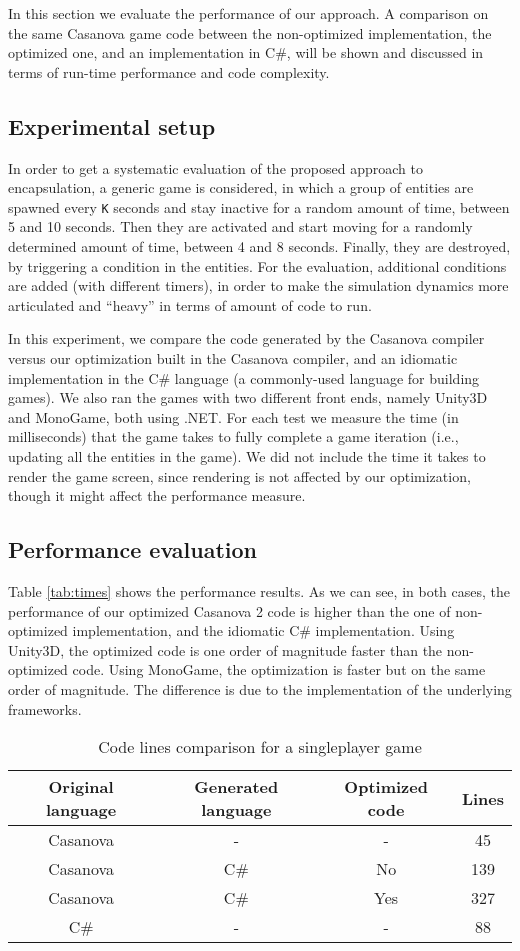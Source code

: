 In this section we evaluate the performance of our approach. A comparison on the same Casanova game code between the non-optimized implementation, the optimized one, and an implementation in C\#, will be shown and discussed in terms of run-time performance and code complexity.

\subsection{Experimental setup} In order to get a systematic evaluation of the proposed approach to encapsulation, a generic game is considered, in which a group of entities are spawned every \texttt{K} seconds and stay inactive for a random amount of time, between 5 and 10 seconds. Then they are activated and start moving for a randomly determined amount of time, between 4 and 8 seconds. Finally, they are destroyed, by triggering a condition in the entities. For the evaluation, additional conditions are added (with different timers), in order to make the simulation dynamics more articulated and ``heavy'' in terms of amount of code to run.


In this experiment, we compare the code generated by the Casanova compiler versus our optimization built in the Casanova compiler, and an idiomatic implementation in the C\# language (a commonly-used language for building games). We also ran the games with two different front ends, namely Unity3D and MonoGame, both using .NET.
For each test we measure the time (in milliseconds) that the game takes to fully complete a game iteration (i.e., updating all the entities in the game). We did not include the time it takes to render the game screen, since rendering is not affected by our optimization, though it might affect the performance measure.
\subsection{Performance evaluation} Table \ref{tab:times} shows the performance results. As we can see, in both cases, the performance of our optimized Casanova 2 code is higher than the one of non-optimized implementation, and the idiomatic C\# implementation. Using Unity3D, the optimized code is one order of magnitude faster than the non-optimized code. Using MonoGame, the optimization is faster but on the same order of magnitude. The difference is due to the implementation of the underlying frameworks.

\begin{table}[!ht]
\caption{Code lines comparison for a singleplayer game}
\label{tab:length}
\centering
\begin{tabular}{ @{}|c|c|c|c|@{} }
\hline
  Original language & Generated language & Optimized code & Lines \\ \hline
  Casanova & - & - & 45 \\
  Casanova & C\# & No & 139 \\
  Casanova & C\# & Yes & 327 \\
  C\# & - & - & 88 \\ \hline
\hline
\end{tabular}
\end{table}

